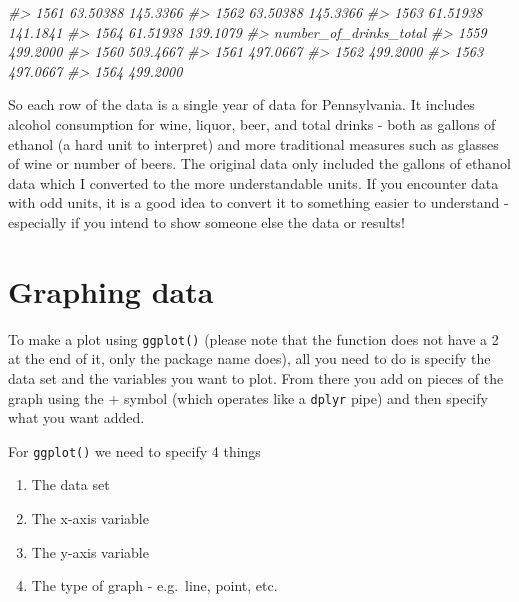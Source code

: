 \documentclass[
]{krantz}
\makeatletter
\newenvironment{Shaded}{\begin{snugshade}}{\end{snugshade}}
\newcommand{\CommentTok}[1]{\textcolor[rgb]{0.37,0.37,0.37}{\textit{#1}}}
\providecommand{\tightlist}{%
  \setlength{\itemsep}{0pt}\setlength{\parskip}{0pt}}
\newenvironment{kframe}{%
\medskip{}
\setlength{\fboxsep}{.8em}
 \def\at@end@of@kframe{}%
 \ifinner\ifhmode%
  \def\at@end@of@kframe{\end{minipage}}%
  \begin{minipage}{\columnwidth}%
 \fi\fi%
 \def\FrameCommand##1{\hskip\@totalleftmargin \hskip-\fboxsep
 \colorbox{shadecolor}{##1}\hskip-\fboxsep
     \hskip-\linewidth \hskip-\@totalleftmargin \hskip\columnwidth}%
 \MakeFramed {\advance\hsize-\width
   \@totalleftmargin\z@ \linewidth\hsize
   \@setminipage}}%
 {\par\unskip\endMakeFramed%
 \at@end@of@kframe}
\renewenvironment{Shaded}{\begin{kframe}}{\end{kframe}}
\makeatother
\begin{document}
\begin{Shaded}
\begin{Highlighting}[]
\CommentTok{\#\textgreater{} 1561               63.50388               145.3366}
\CommentTok{\#\textgreater{} 1562               63.50388               145.3366}
\CommentTok{\#\textgreater{} 1563               61.51938               141.1841}
\CommentTok{\#\textgreater{} 1564               61.51938               139.1079}
\CommentTok{\#\textgreater{}      number\_of\_drinks\_total}
\CommentTok{\#\textgreater{} 1559               499.2000}
\CommentTok{\#\textgreater{} 1560               503.4667}
\CommentTok{\#\textgreater{} 1561               497.0667}
\CommentTok{\#\textgreater{} 1562               499.2000}
\CommentTok{\#\textgreater{} 1563               497.0667}
\CommentTok{\#\textgreater{} 1564               499.2000}
\end{Highlighting}
\end{Shaded}

So each row of the data is a single year of data for Pennsylvania. It includes alcohol consumption for wine, liquor, beer, and total drinks - both as gallons of ethanol (a hard unit to interpret) and more traditional measures such as glasses of wine or number of beers. The original data only included the gallons of ethanol data which I converted to the more understandable units. If you encounter data with odd units, it is a good idea to convert it to something easier to understand - especially if you intend to show someone else the data or results!

\hypertarget{graphing-data}{%
\section{Graphing data}\label{graphing-data}}

To make a plot using \texttt{ggplot()} (please note that the function does not have a 2 at the end of it, only the package name does), all you need to do is specify the data set and the variables you want to plot. From there you add on pieces of the graph using the + symbol (which operates like a \texttt{dplyr} pipe) and then specify what you want added.

For \texttt{ggplot()} we need to specify 4 things

\begin{enumerate}
\def\labelenumi{\arabic{enumi}.}
\tightlist
\item
  The data set
\item
  The x-axis variable
\item
  The y-axis variable
\item
  The type of graph - e.g.~line, point, etc.
\end{enumerate}
\end{document}
